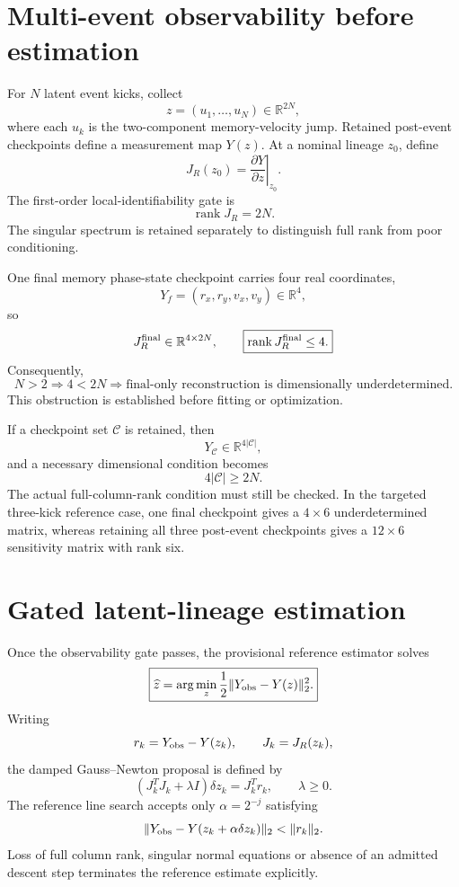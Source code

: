\section{Multi-event observability before estimation}

For \(N\) latent event kicks, collect
\[
z=(u_1,\ldots,u_N)\in\mathbb R^{2N},
\]
where each \(u_k\) is the two-component memory-velocity jump. Retained post-event checkpoints define a measurement map \(Y(z)\). At a nominal lineage \(z_0\), define
\[
\boxed{
J_R(z_0)=\left.\frac{\partial Y}{\partial z}\right|_{z_0}.
}
\]
The first-order local-identifiability gate is
\[
\boxed{\operatorname{rank}J_R=2N.}
\]
The singular spectrum is retained separately to distinguish full rank from poor conditioning.

One final memory phase-state checkpoint carries four real coordinates,
\[
Y_f=(r_x,r_y,v_x,v_y)\in\mathbb R^4,
\]
so
\[
J_R^{\rm final}\in\mathbb R^{4\times2N},
\qquad
\boxed{\operatorname{rank}J_R^{\rm final}\le4.}
\]
Consequently,
\[
\boxed{
N>2
\Longrightarrow
4<2N
\Longrightarrow
\text{final-only reconstruction is dimensionally underdetermined}.
}
\]
This obstruction is established before fitting or optimization.

If a checkpoint set \(\mathcal C\) is retained, then
\[
Y_{\mathcal C}\in\mathbb R^{4|\mathcal C|},
\]
and a necessary dimensional condition becomes
\[
\boxed{4|\mathcal C|\ge2N.}
\]
The actual full-column-rank condition must still be checked. In the targeted three-kick reference case, one final checkpoint gives a \(4\times6\) underdetermined matrix, whereas retaining all three post-event checkpoints gives a \(12\times6\) sensitivity matrix with rank six.

\section{Gated latent-lineage estimation}

Once the observability gate passes, the provisional reference estimator solves
\[
\boxed{
\widehat z
=\arg\min_z\frac12\|Y_{\rm obs}-Y(z)\|_2^2.
}
\]
Writing
\[
r_k=Y_{\rm obs}-Y(z_k),
\qquad
J_k=J_R(z_k),
\]
the damped Gauss--Newton proposal is defined by
\[
\boxed{
(J_k^T J_k+\lambda I)\delta z_k
=J_k^T r_k,
\qquad \lambda\ge0.
}
\]
The reference line search accepts only \(\alpha=2^{-j}\) satisfying
\[
\|Y_{\rm obs}-Y(z_k+\alpha\delta z_k)\|_2
<\|r_k\|_2.
\]
Loss of full column rank, singular normal equations or absence of an admitted descent step terminates the reference estimate explicitly.

